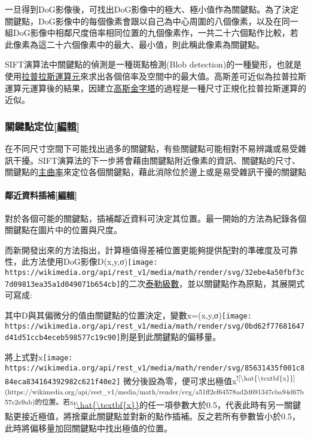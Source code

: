 \documentclass[
]{article}
\begin{document}
一旦得到DoG影像後，可找出DoG影像中的極大、極小值作為關鍵點。為了決定關鍵點，DoG影像中的每個像素會跟以自己為中心周圍的八個像素，以及在同一組DoG影像中相鄰尺度倍率相同位置的九個像素作，一共二十六個點作比較，若此像素為這二十六個像素中的最大、最小值，則此稱此像素為關鍵點。

SIFT演算法中關鍵點的偵測是一種斑點檢測(Blob
detection)的一種變形，也就是使用\href{https://zh.wikipedia.org/wiki/拉普拉斯算子}{拉普拉斯運算元}來求出各個倍率及空間中的最大值。高斯差可近似為拉普拉斯運算元運算後的結果，因建立\href{https://zh.wikipedia.org/wiki/高斯金字塔}{高斯金字塔}的過程是一種尺寸正規化拉普拉斯運算的近似。

\hypertarget{header-n36}{%
\subsubsection{\texorpdfstring{關鍵點定位{[}\href{https://zh.wikipedia.org/w/index.php?title=尺度不變特徵轉換\&action=edit\&section=4}{編輯}{]}}{關鍵點定位{[}編輯{]}}}\label{header-n36}}

在不同尺寸空間下可能找出過多的關鍵點，有些關鍵點可能相對不易辨識或易受雜訊干擾。SIFT演算法的下一步將會藉由關鍵點附近像素的資訊、關鍵點的尺寸、關鍵點的\href{https://zh.wikipedia.org/wiki/主曲率}{主曲率}來定位各個關鍵點，藉此消除位於邊上或是易受雜訊干擾的關鍵點

\hypertarget{header-n38}{%
\paragraph{\texorpdfstring{鄰近資料插補{[}\href{https://zh.wikipedia.org/w/index.php?title=尺度不變特徵轉換\&action=edit\&section=5}{編輯}{]}}{鄰近資料插補{[}編輯{]}}}\label{header-n38}}

對於各個可能的關鍵點，插補鄰近資料可決定其位置。最一開始的方法為紀錄各個關鍵點在圖片中的位置與尺度。

而新開發出來的方法指出，計算極值得差補位置更能夠提供配對的準確度及可靠性，此方法使用DoG影像D(x,y,σ)\texttt{[image: https://wikimedia.org/api/rest\_v1/media/math/render/svg/32ebe4a50fbf3c7d09813ea35a1d049071b654cb]}的二次\href{https://zh.wikipedia.org/wiki/泰勒级数}{泰勒級數}，並以關鍵點作為原點，其展開式可寫成:

其中D與其偏微分的值由關鍵點的位置決定，變數x=(x,y,σ)\texttt{[image: https://wikimedia.org/api/rest\_v1/media/math/render/svg/0bd62f77681647d41d51ccb4eceb598577c19c90]}則是到此關鍵點的偏移量。

將上式對x\texttt{[image: https://wikimedia.org/api/rest\_v1/media/math/render/svg/85631435f001c884eca834164392982c621f40e2]}
微分後設為零，便可求出極值x\textsuperscript{!{[}\textbackslash hat\{\textbackslash textbf\{x\}\}{]}(https://wikimedia.org/api/rest\_v1/media/math/render/svg/a51ff2ef64578ad2d691347cba94d67b57c2e9ab)的位置。若x}!\href{https://wikimedia.org/api/rest_v1/media/math/render/svg/a51ff2ef64578ad2d691347cba94d67b57c2e9ab}{\textbackslash hat\{\textbackslash textbf\{x\}\}}的任一項參數大於0.5，代表此時有另一關鍵點更接近極值，將捨棄此關鍵點並對新的點作插補。反之若所有參數皆小於0.5，此時將偏移量加回關鍵點中找出極值的位置。
\end{document}
